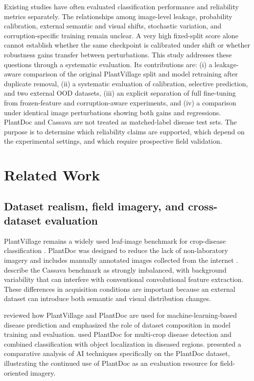 \documentclass{sbc2023}%
\begin{document}
Existing studies have often evaluated classification performance and reliability metrics separately. The relationships among image-level leakage, probability calibration, external semantic and visual shifts, stochastic variation, and corruption-specific training remain unclear. A very high fixed-split score alone cannot establish whether the same checkpoint is calibrated under shift or whether robustness gains transfer between perturbations. This study addresses these questions through a systematic evaluation. Its contributions are: (i) a leakage-aware comparison of the original PlantVillage split and model retraining after duplicate removal, (ii) a systematic evaluation of calibration, selective prediction, and two external OOD datasets, (iii) an explicit separation of full fine-tuning from frozen-feature and corruption-aware experiments, and (iv) a comparison under identical image perturbations showing both gains and regressions. PlantDoc and Cassava are not treated as matched-label disease test sets. The purpose is to determine which reliability claims are supported, which depend on the experimental settings, and which require prospective field validation.

\section{Related Work}\label{sec:related}
\subsection{Dataset realism, field imagery, and cross-dataset evaluation}
PlantVillage remains a widely used leaf-image benchmark for crop-disease classification \cite{r01}. PlantDoc was designed to reduce the lack of non-laboratory imagery and includes manually annotated images collected from the internet \cite{r02}. \citet{r03} describe the Cassava benchmark as strongly imbalanced, with background variability that can interfere with conventional convolutional feature extraction. These differences in acquisition conditions are important because an external dataset can introduce both semantic and visual distribution changes.

\citet{r16} reviewed how PlantVillage and PlantDoc are used for machine-learning-based disease prediction and emphasized the role of dataset composition in model training and evaluation. \citet{r30} used PlantDoc for multi-crop disease detection and combined classification with object localization in diseased regions. \citet{r35} presented a comparative analysis of AI techniques specifically on the PlantDoc dataset, illustrating the continued use of PlantDoc as an evaluation resource for field-oriented imagery.
\end{document}
